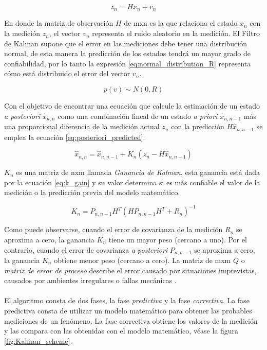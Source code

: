 \begin{equation}
z_n = Hx_n+v_n
\label{eq:measurement_equation}
\end{equation}

En donde la matriz de observación $H$ de mxn es la que relaciona el estado $x_n$ con la medición $z_n$, el vector $v_n$ representa el ruido aleatorio en la medición. El Filtro de Kalman supone que el error en las mediciones debe tener una distribución normal, de esta manera la predicción de los estados tendrá un mayor grado de confiabilidad, por lo tanto la expresión \ref{eq:normal_distribution_R} representa cómo está distribuido el error del vector $v_n$. 

\begin{equation}
p(v) \sim N(0,R)
\label{eq:normal_distribution_R}
\end{equation}

Con el objetivo de encontrar una ecuación que calcule la estimación de un estado \textit{a posteriori} $\hat{x}_{n,n}$ como una combinación lineal de un estado \textit{a priori} $\hat{x}_{n, n-1}$ más una proporcional diferencia de la medición actual $z_n$ con la predicción $H\hat{x}_{n,n-1}$ se emplea la ecuación \ref{eq:posteriori_predicted}.

\begin{equation}
\hat{x}_{n,n} = \hat{x}_{n,n-1} + K_n (z_n-H\hat{x}_{n,n-1})
\label{eq:posteriori_predicted}
\end{equation}

$K_n$ es una matriz de nxm llamada \textit{Ganancia de Kalman}, esta ganancia está dada por la ecuación \ref{eq:k_gain} y su valor determina si es más confiable el valor de la medición o la predicción previa del modelo matemático.

\begin{equation}
K_n = P_{n,n-1}H^T(HP_{n,n-1}H^T+R_n)^{-1}
\label{eq:k_gain}
\end{equation}

Como puede observarse, cuando el error de covarianza de la medición $R_n$ se aproxima a cero, la ganancia $K_n$  tiene un mayor peso (cercano a uno). Por el contrario, cuando el error de covarianza \textit{a posteriori} $P_{n,n-1}$ se aproxima a cero, la ganancia $K_n$ obtiene menor peso (cercano a cero).
	La matriz de mxm $Q$ o \textit{matriz de error de proceso} describe el error causado por situaciones imprevistas, causados por ambientes irregulares o fallas mecánicas .	
\\
\\
	El algoritmo consta de dos fases, la fase \textit{predictiva} y la fase \textit{correctiva}. La fase predictiva consta de utilizar un modelo matemático para obtener las probables mediciones de un fenómeno. La fase correctiva obtiene los valores de la medición y las compara con las obtenidas con el modelo matemático, véase la figura \ref{fig:Kalman_scheme}.

